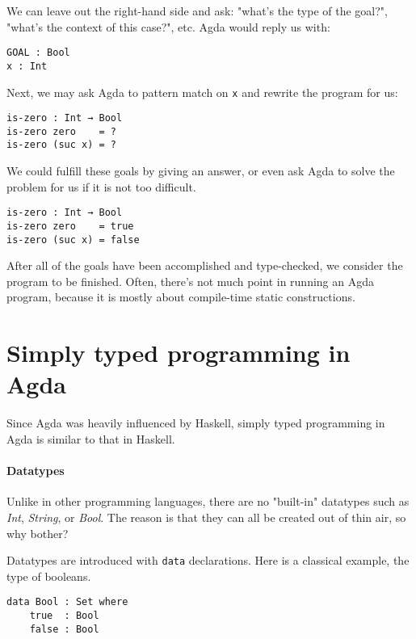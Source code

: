 \documentclass[../thesis.tex]{subfiles}
\begin{document}
We can leave out the right-hand side and ask:
"what's the type of the goal?", "what's the context of this case?", etc.
Agda would reply us with:

\begin{lstlisting}
GOAL : Bool
x : Int
\end{lstlisting}

Next, we may ask Agda to pattern match on {\lstinline|x|} and rewrite the program for us:

\begin{lstlisting}
is-zero : Int → Bool
is-zero zero    = ?
is-zero (suc x) = ?
\end{lstlisting}

We could fulfill these goals by giving an answer,
or even ask Agda to solve the problem for us if it is not too difficult.

\begin{lstlisting}
is-zero : Int → Bool
is-zero zero    = true
is-zero (suc x) = false
\end{lstlisting}

After all of the goals have been accomplished and type-checked,
we consider the program to be finished.
Often, there's not much point in running an Agda program,
because it is mostly about compile-time static constructions.

\section{Simply typed programming in Agda}

Since Agda was heavily influenced by Haskell, simply typed programming in Agda
is similar to that in Haskell.

\paragraph{Datatypes}

Unlike in other programming languages, there are no "built-in"
datatypes such as \textit{Int}, \textit{String}, or \textit{Bool}.
The reason is that they can all be created out of thin air, so why bother?

Datatypes are introduced with {\lstinline|data|} declarations.
Here is a classical example, the type of booleans.

\begin{lstlisting}
data Bool : Set where
    true  : Bool
    false : Bool
\end{lstlisting}
\end{document}
